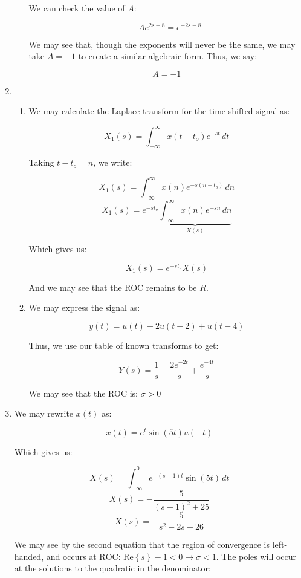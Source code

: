 \begin{enumerate}
\begin{enumerate}
        We can check the value of $A$:

        $$-Ae^{2s+8}=e^{-2s-8}$$

        We may see that, though the exponents will never be the same, we may take $A=-1$ to create a similar algebraic form. Thus, we say:

        $$\boxed{A=-1}$$

    \end{enumerate}

  \item

    \begin{enumerate}

      \item We may calculate the Laplace transform for the time-shifted signal as:

        $$X_1(s)=\int_{-\infty}^{\infty}x(t-t_o)e^{-st}\,dt$$

        Taking $t-t_o= n$, we write:

        $$X_1(s)=\int_{-\infty}^{\infty}x(n)e^{-s(n+t_o)}\,dn$$
        $$X_1(s)=e^{-st_o}\underbrace{\int_{-\infty}^{\infty}x(n)e^{-sn}\,dn}_{X(s)}$$

        Which gives us:

        $$\boxed{X_1(s)=e^{-st_o}X(s)}$$

        And we may see that the ROC remains to be $R$.

      \item We may express the signal as:

        $$y(t)=u(t)-2u(t-2)+u(t-4)$$

        Thus, we use our table of known transforms to get:

        $$\boxed{Y(s)=\frac{1}{s}-\frac{2e^{-2t}}{s}+\frac{e^{-4t}}{s}}$$

        We may see that the ROC is: $\boxed{\sigma>0}$

    \end{enumerate}

  \item

    We may rewrite $x(t)$ as:

    $$x(t)=e^t\sin(5t)u(-t)$$

    Which gives us:

    $$X(s)=\int_{-\infty}^{0}e^{-(s-1)t}\sin(5t)\,dt$$
    $$X(s)=-\frac{5}{(s-1)^2+25}$$
    $$\boxed{X(s)=-\frac{5}{s^2-2s+26}}$$

    We may see by the second equation that the region of convergence is left-handed, and occurs at $\boxed{\text{ROC: }\text{Re}\left\{s\right\}-1<0\longrightarrow \sigma <1}$. The poles will occur at the solutions to the quadratic in the denominator:


\end{enumerate}
